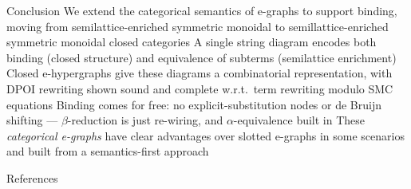 \documentclass[aspectratio=169]{beamer}
\begin{document}
\begin{frame}{Conclusion}
  We extend the categorical semantics of e-graphs to support \alert{binding},
  moving from semilattice-enriched symmetric monoidal to semillattice-enriched symmetric monoidal \alert{closed} categories
  \vfill
  A single string diagram encodes both \alert{binding} (closed structure) and
  \alert{equivalence} of subterms (semilattice enrichment)
  \vfill
  \alert{Closed e-hypergraphs} give these diagrams a combinatorial
  representation, with DPOI rewriting shown \alert{sound and complete} w.r.t.\
  term rewriting modulo SMC equations
  \vfill
  Binding comes \alert{for free}: no explicit-substitution nodes or de Bruijn
  shifting --- $\beta$-reduction is just re-wiring, and $\alpha$-equivalence built in
  \vfill These \emph{categorical e-graphs} have clear advantages over slotted e-graphs in some scenarios and built from a semantics-first approach
\end{frame}


\appendix

\begin{frame}[allowframebreaks]{References}
\footnotesize
\printbibliography
\end{frame}
\end{document}
